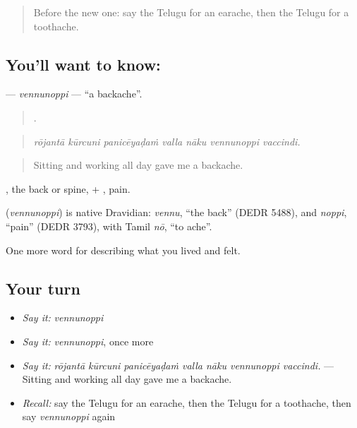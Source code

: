 \label{lesson:TE-C514-vennunoppi}



\begin{quote}
Before the new one: say the Telugu for an earache, then the Telugu for a toothache.
\end{quote}

\subsection*{You'll want to know: }
\textbf{} — \emph{vennunoppi} — \textquotedblleft{}a backache\textquotedblright{}.

\begin{quote}
      .
\end{quote}

\begin{quote}
\emph{rōjantā kūrcuni panicēyaḍaṁ valla nāku vennunoppi vaccindi.}
\end{quote}

\begin{quote}
Sitting and working all day gave me a backache.
\end{quote}

, the back or spine, + , pain.

\begin{cousinweb}
\textbf{} (\emph{vennunoppi}) is native Dravidian: \emph{vennu}, \textquotedblleft{}the back\textquotedblright{} (DEDR 5488), and \emph{noppi}, \textquotedblleft{}pain\textquotedblright{} (DEDR 3793), with Tamil \emph{nō}, \textquotedblleft{}to ache\textquotedblright{}.
\end{cousinweb}

\begin{grammarlens}[title={What you've built}]
One more word for describing what you lived and felt.
\end{grammarlens}

\subsection*{Your turn}
\begin{itemize}
\raggedright
  \item \emph{Say it:} \emph{vennunoppi}
  \item \emph{Say it:} \emph{vennunoppi}, once more
  \item \emph{Say it:} \emph{rōjantā kūrcuni panicēyaḍaṁ valla nāku vennunoppi vaccindi.} — Sitting and working all day gave me a backache.
  \item \emph{Recall:} say the Telugu for an earache, then the Telugu for a toothache, then say \emph{vennunoppi} again
\end{itemize}

